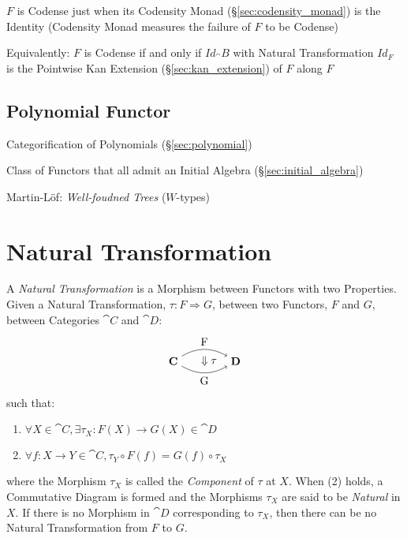 $F$ is Codense just when its Codensity Monad
(\S\ref{sec:codensity_monad}) is the Identity (Codensity Monad
measures the failure of $F$ to be Codense)

Equivalently: $F$ is Codense if and only if $Id_\cat{B}$ with Natural
Transformation $Id_F$ is the Pointwise Kan Extension
(\S\ref{sec:kan_extension}) of $F$ along $F$



\subsection{Polynomial Functor} \label{sec:polynomial_functor}

Categorification of Polynomials (\S\ref{sec:polynomial})

Class of Functors that all admit an Initial Algebra
(\S\ref{sec:initial_algebra})

Martin-L\"of: \emph{Well-foudned Trees} ($W$-types) %



\section{Natural Transformation}\label{sec:natural_transformation}

A \emph{Natural Transformation} is a Morphism between Functors with
two Properties. Given a Natural Transformation, $\tau : F \Rightarrow
G$, between two Functors, $F$ and $G$, between Categories $\cat{C}$
and $\cat{D}$:
\[
  \begin{tikzpicture}
    \node (C) at (-1,0) {$\cat{C}$};
    \node (D) at (1,0) {$\cat{D}$};
    \node (T) at (0,0) {$\;\;\;\Downarrow\tau$};
    \draw[->,bend left] (C) to node [above] {F} (D);
    \draw[->,bend right] (C) to node [below] {G} (D);
  \end{tikzpicture}
\]
such that:
\begin{enumerate}
  \item $\forall X \in \cat{C},
    \exists \tau_X : F(X) \rightarrow G(X) \in \cat{D}$
  \item $\forall f : X \rightarrow Y \in \cat{C},
    \tau_Y \circ F(f) = G(f) \circ \tau_X$
\end{enumerate}
where the Morphism $\tau_X$ is called the \emph{Component} of $\tau$
at $X$. When (2) holds, a Commutative Diagram is formed and the
Morphisms $\tau_X$ are said to be \emph{Natural} in $X$. If there is
no Morphism in $\cat{D}$ corresponding to $\tau_X$, then there can
be no Natural Transformation from $F$ to $G$.

